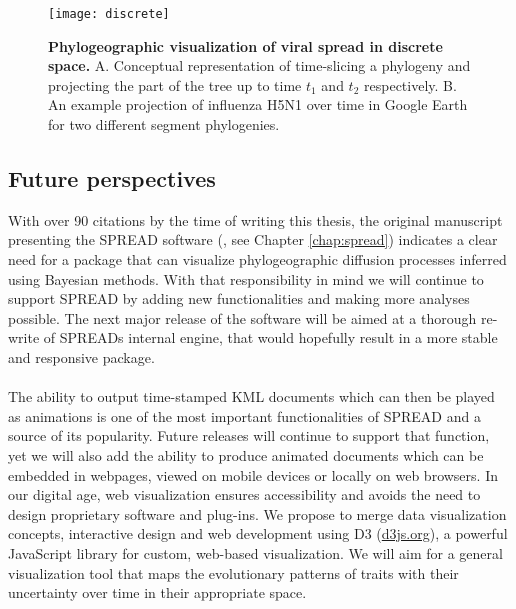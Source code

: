 \begin{figure}[H]
\centering
\texttt{[image: discrete]}
\caption{
{ \footnotesize 
{\bf Phylogeographic visualization of viral spread in discrete space.} 
A. Conceptual representation of time-slicing a phylogeny and projecting the part of the tree up to time $t_{1}$ and $t_{2}$ respectively. 
B. An example projection of influenza H5N1 over time in Google Earth for two different segment phylogenies. %
} %
}
\label{fig:discrete}
\end{figure}

\subsection{Future perspectives}

With over 90 citations by the time of writing this thesis, the original manuscript presenting the SPREAD software (\citet{Bielejec2011}, see Chapter \ref{chap:spread}) indicates a clear need for a package that can visualize phylogeographic diffusion processes inferred using Bayesian methods.
With that responsibility in mind we will continue to support SPREAD by adding new functionalities and making more analyses possible.
The next major release of the software will be aimed at a thorough re-write of SPREADs internal engine, that would hopefully result in a more stable and responsive package.

\paragraph{}
The ability to output time-stamped KML documents which can then be played as animations is one of the most important functionalities of SPREAD and a source of its popularity.
Future releases will continue to support that function, yet we will also add the ability to produce animated documents which can be embedded in webpages, viewed on mobile devices or locally on web browsers.
In our digital age, web visualization ensures accessibility and avoids the need to design proprietary software and plug-ins. We propose to merge data visualization concepts, interactive design and web development using D3 (\url{d3js.org}), a powerful JavaScript library for custom, web-based visualization. 
We will aim for a general visualization tool that maps the evolutionary patterns of traits with their uncertainty over time in their appropriate space. 



